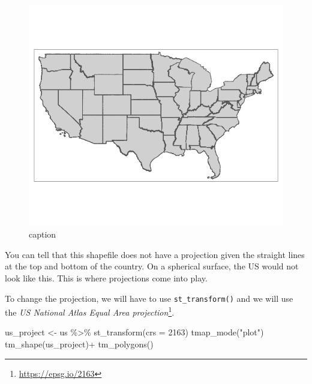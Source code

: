 \documentclass[
  krantz2]{krantz}
\makeatletter
\newenvironment{Shaded}{\begin{snugshade}}{\end{snugshade}}
\newcommand{\AttributeTok}[1]{\textcolor[rgb]{0.61,0.61,0.61}{#1}}
\newcommand{\DecValTok}[1]{\textcolor[rgb]{0.06,0.06,0.06}{#1}}
\newcommand{\FunctionTok}[1]{\textcolor[rgb]{0,0,0}{#1}}
\newcommand{\NormalTok}[1]{#1}
\newcommand{\OtherTok}[1]{\textcolor[rgb]{0.37,0.37,0.37}{#1}}
\newcommand{\SpecialCharTok}[1]{\textcolor[rgb]{0,0,0}{#1}}
\newcommand{\StringTok}[1]{\textcolor[rgb]{0.5,0.5,0.5}{#1}}
\newenvironment{kframe}{%
\medskip{}
\setlength{\fboxsep}{.8em}
 \def\at@end@of@kframe{}%
 \ifinner\ifhmode%
  \def\at@end@of@kframe{\end{minipage}}%
  \begin{minipage}{\columnwidth}%
 \fi\fi%
 \def\FrameCommand##1{\hskip\@totalleftmargin \hskip-\fboxsep
 \colorbox{shadecolor}{##1}\hskip-\fboxsep
     \hskip-\linewidth \hskip-\@totalleftmargin \hskip\columnwidth}%
 \MakeFramed {\advance\hsize-\width
   \@totalleftmargin\z@ \linewidth\hsize
   \@setminipage}}%
 {\par\unskip\endMakeFramed%
 \at@end@of@kframe}
\renewenvironment{Shaded}{\begin{kframe}}{\end{kframe}}
\makeatother
\begin{document}
\begin{figure}
\centering
\includegraphics{tmap-images/unprojected-2.png}
\caption{caption}
\end{figure}

You can tell that this shapefile does not have a projection given the straight lines at the top and bottom of the country. On a spherical surface, the US would not look like this. This is where projections come into play.

To change the projection, we will have to use \texttt{st\_transform()} and we will use the \emph{US National Atlas Equal Area projection}\footnote{\url{https://epsg.io/2163}}.

\begin{Shaded}
\begin{Highlighting}[]
\NormalTok{us\_project }\OtherTok{\textless{}{-}}\NormalTok{ us }\SpecialCharTok{\%\textgreater{}\%} \FunctionTok{st\_transform}\NormalTok{(}\AttributeTok{crs =} \DecValTok{2163}\NormalTok{) }
\FunctionTok{tmap\_mode}\NormalTok{(}\StringTok{"plot"}\NormalTok{)}
\FunctionTok{tm\_shape}\NormalTok{(us\_project)}\SpecialCharTok{+}
  \FunctionTok{tm\_polygons}\NormalTok{()}
\end{Highlighting}
\end{Shaded}
\end{document}
